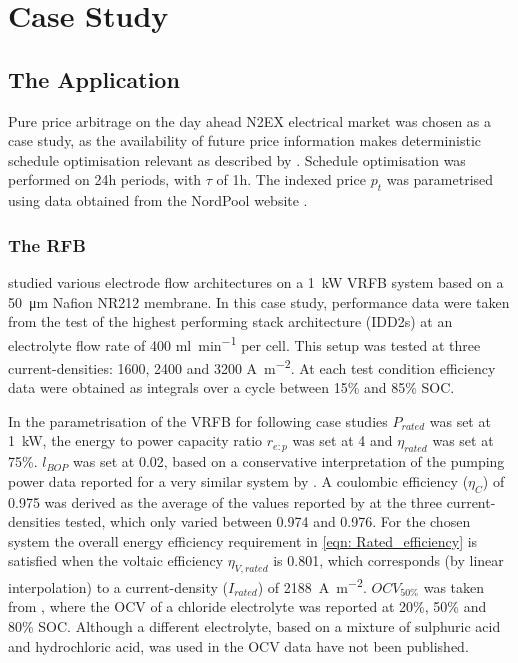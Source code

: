 \documentclass[preprint,3p,review,authoryear,10pt]{elsarticle}
\begin{document}
\section{Case Study}
\label{Case Study}

\subsection{The Application}
\label{Results_The_Application}
Pure price arbitrage on the day ahead N2EX electrical market was chosen as a case study, as the availability of future price information makes deterministic schedule optimisation relevant as described by \cite{Hu2010}. Schedule optimisation was performed on 24h periods, with $\tau$ of 1h. The indexed price $p_t$ was parametrised using data obtained from the NordPool website \cite{NordPool2016}.

\subsubsection{The RFB}
\label{Model_Formulation_VRFB_Params}
\cite{Reed2016} studied various electrode flow architectures on a \SI{1}{\kilo\watt} VRFB system based on a \SI{50}{\micro\meter} Nafion NR212 membrane. In this case study, performance data were taken from the test of the highest performing stack architecture (IDD2s) at an electrolyte flow rate of 400 \si{\ml\per\minute} per cell. This setup was tested at three current-densities: 1600, 2400 and 3200 \si{\ampere\per\square\meter}. At each test condition efficiency data were obtained as integrals over a cycle between 15\% and 85\% SOC. 

In the parametrisation of the VRFB for following case studies $P_{rated}$ was set at \SI{1}{\kilo\watt}, the energy to power capacity ratio $r_{e:p}$ was set at 4 and $\eta_{rated}$ was set at 75\%. $l_{BOP}$ was set at 0.02, based on a conservative interpretation of the pumping power data reported for a very similar system by \cite{Kim2013}. A coulombic efficiency ($\eta_C$) of 0.975 was derived as the average of the values reported by \cite{Reed2016} at the three current-densities tested, which only varied between 0.974 and 0.976.  For the chosen system the overall energy efficiency requirement in \cref{eqn: Rated_efficiency} is satisfied when the voltaic efficiency $\eta_{V,rated}$ is 0.801, which corresponds (by linear interpolation) to a current-density ($I_{rated}$) of \SI{2188}{\ampere\per\square\meter}. $OCV_{50\%}$ was taken from \cite{Kim2011}, where the OCV of a chloride electrolyte was reported at 20\%, 50\% and 80\% SOC. Although a different electrolyte, based on a mixture of sulphuric acid and hydrochloric acid, was used in \cite{Reed2016} the OCV data have not been published.
\end{document}
